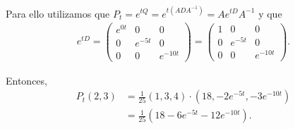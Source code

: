 Para ello utilizamos que $P_t = e^{tQ} = e^{t(ADA^{-1})} = Ae^{tD}A^{-1}$ y que
\begin{align}
    e^{tD}  =   
                \begin{pmatrix}
                    e^{0 t} &   0           &   0      \\
                    0       &   e^{-5 t}    &   0      \\
                    0       &   0           &   e^{-10 t}
                \end{pmatrix}
            =   
                \begin{pmatrix}
                    1       &   0           &   0      \\
                    0       &   e^{-5 t}    &   0      \\
                    0       &   0           &   e^{-10 t}
                \end{pmatrix}.
\end{align}

Entonces, 
\begin{align}
        P_t(2,3) &= \frac{1}{25} (1,3,4) \cdot (18, -2e^{-5t}, -3e^{-10t})                                                                                 \\
                 &= \frac{1}{25} (18 - 6e^{-5t} - 12e^{-10t}).                                                                                                \\
\end{align}